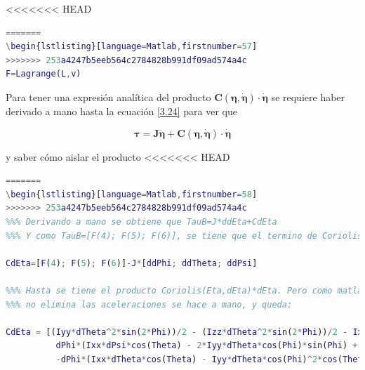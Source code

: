 \documentclass[twoside,11pt]{report}
\begin{document}
<<<<<<< HEAD
\begin{lstlisting}[language=Matlab,firstnumber=56]
=======
\begin{lstlisting}[language=Matlab,firstnumber=57]
>>>>>>> 253a4247b5eeb564c2784828b991df09ad574a4c
F=Lagrange(L,v)
\end{lstlisting}


Para tener una expresión analítica del producto $\pmb{C(\eta,\dot{\eta})\cdot \dot{\eta}}$ se requiere haber derivado a mano hasta la ecuación \ref{3.24} para ver que 

\begin{equation}
\pmb{\tau}=\pmb{J}\ddot{\pmb{\eta}} + \pmb{C(\eta,\dot{\eta})\cdot \dot{\eta}}
\end{equation}

y saber cómo aislar el producto
\singlespacing
<<<<<<< HEAD
\begin{lstlisting}[language=Matlab,firstnumber=57]
=======
\begin{lstlisting}[language=Matlab,firstnumber=58]
>>>>>>> 253a4247b5eeb564c2784828b991df09ad574a4c
%%% Derivando a mano se obtiene que TauB=J*ddEta+CdEta 
%%% Y como TauB=[F(4); F(5); F(6)], se tiene que el termino de Coriolis es:

CdEta=[F(4); F(5); F(6)]-J*[ddPhi; ddTheta; ddPsi]

%%% Hasta se tiene el producto Coriolis(Eta,dEta)*dEta. Pero como matlab
%%% no elimina las aceleraciones se hace a mano, y queda:

CdEta = [(Iyy*dTheta^2*sin(2*Phi))/2 - (Izz*dTheta^2*sin(2*Phi))/2 - Ixx*dPsi*dTheta*cos(Theta) - (Iyy*dPsi^2*sin(2*Phi)*cos(Theta)^2)/2 + (Izz*dPsi^2*sin(2*Phi)*cos(Theta)^2)/2 - Iyy*dPsi*dTheta*cos(2*Phi)*cos(Theta) + Izz*dPsi*dTheta*cos(2*Phi)*cos(Theta);
          dPhi*(Ixx*dPsi*cos(Theta) - 2*Iyy*dTheta*cos(Phi)*sin(Phi) + 2*Izz*dTheta*cos(Phi)*sin(Phi) + Iyy*dPsi*cos(Phi)^2*cos(Theta) - Izz*dPsi*cos(Phi)^2*cos(Theta) - Iyy*dPsi*cos(Theta)*sin(Phi)^2 + Izz*dPsi*cos(Theta)*sin(Phi)^2)  - Ixx*dPsi^2*cos(Theta)*sin(Theta) + Iyy*dPsi^2*cos(Theta)*sin(Phi)^2*sin(Theta)  + Izz*dPsi^2*cos(Phi)^2*cos(Theta)*sin(Theta);
          -dPhi*(Ixx*dTheta*cos(Theta) - Iyy*dTheta*cos(Phi)^2*cos(Theta) + Izz*dTheta*cos(Phi)^2*cos(Theta) + Iyy*dTheta*cos(Theta)*sin(Phi)^2 - Izz*dTheta*cos(Theta)*sin(Phi)^2 - 2*Iyy*dPsi*cos(Phi)*cos(Theta)^2*sin(Phi) + 2*Izz*dPsi*cos(Phi)*cos(Theta)^2*sin(Phi)) - Iyy*dTheta^2*cos(Phi)*sin(Phi)*sin(Theta) + Izz*dTheta^2*cos(Phi)*sin(Phi)*sin(Theta) + 2*Ixx*dPsi*dTheta*cos(Theta)*sin(Theta) - 2*Izz*dPsi*dTheta*cos(Phi)^2*cos(Theta)*sin(Theta) - 2*Iyy*dPsi*dTheta*cos(Theta)*sin(Phi)^2*sin(Theta)]     
\end{lstlisting}
\end{document}
